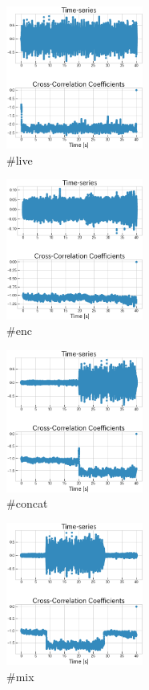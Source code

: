 \documentclass[technicalreport]{ieicej}
\begin{document}
\begin{figure}
	\centering
	\includegraphics[width=0.4\textwidth]{fig/live.png}
	\caption{\#live}
	\label{fig:result_live}
\end{figure}
\begin{figure}
	\centering
	\includegraphics[width=0.4\textwidth]{fig/env.png}
	\caption{\#enc}
	\label{fig:result_env}
\end{figure}
\begin{figure}
	\centering
	\includegraphics[width=0.4\textwidth]{fig/concat.png}
	\caption{\#concat}
	\label{fig:result_concat}
\end{figure}
\begin{figure}
	\centering
	\includegraphics[width=0.4\textwidth]{fig/mix.png}
	\caption{\#mix}
	\label{fig:result_mix}
\end{figure}
\end{document}
